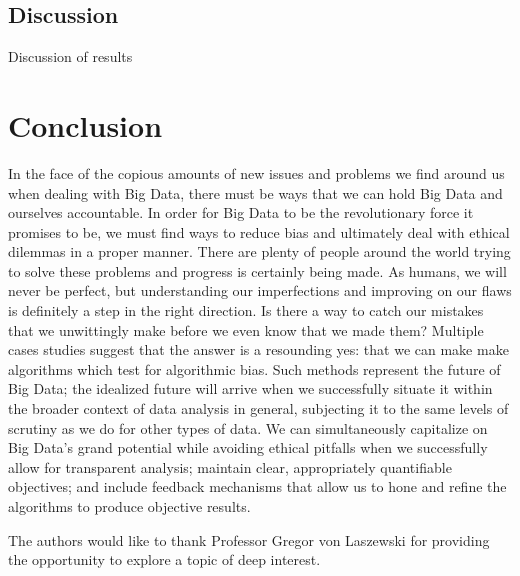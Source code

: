 \documentclass[sigconf]{acmart}
\begin{document}
\subsection{Discussion}

Discussion of results

\section{Conclusion}

In the face of the copious amounts of new issues and problems we find around us when dealing with Big Data, there must be ways that we can hold Big Data and ourselves accountable. In order for Big Data to be the revolutionary force it promises to be, we must find ways to reduce bias and ultimately deal with ethical dilemmas in a proper manner. There are plenty of people around the world trying to solve these problems and progress is certainly being made. As humans, we will never be perfect, but understanding our imperfections and improving on our flaws is definitely a step in the right direction. Is there a way to catch our mistakes that we unwittingly make before we even know that we made them? Multiple cases studies suggest that the answer is a resounding yes: that we can make make algorithms which test for algorithmic bias. Such methods represent the future of Big Data; the idealized future will arrive when we successfully situate it within the broader context of data analysis in general, subjecting it to the same levels of scrutiny as we do for other types of data. We can simultaneously capitalize on Big Data's grand potential while avoiding ethical pitfalls when we successfully allow for transparent analysis; maintain clear, appropriately quantifiable objectives; and include feedback mechanisms that allow us to hone and refine the algorithms to produce objective results. 


\begin{acks}
The authors would like to thank Professor Gregor von Laszewski for providing the opportunity to explore a topic of deep interest.

\end{acks}



 
\end{document}
